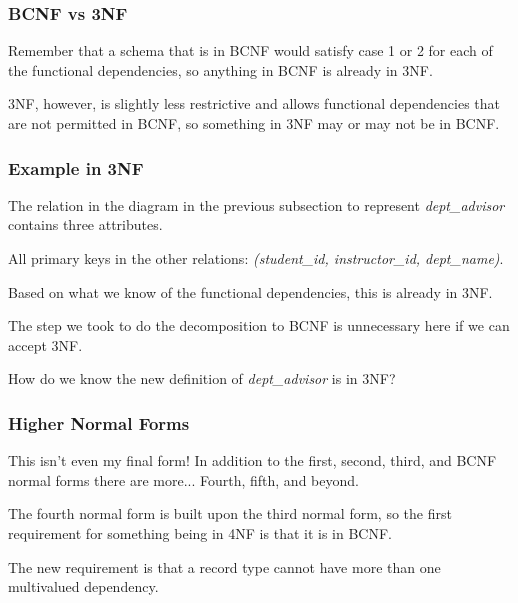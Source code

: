 \begin{frame}
\frametitle{BCNF vs 3NF}

Remember that a schema that is in BCNF would satisfy case 1 or 2 for each of the functional dependencies, so anything in BCNF is already in 3NF. 

3NF, however, is slightly less restrictive and allows functional dependencies that are not permitted in BCNF, so something in 3NF may or may not be in BCNF.

\end{frame}



\begin{frame}
\frametitle{Example in 3NF}

The relation in the diagram in the previous subsection to represent \textit{dept\_advisor} contains three attributes. 

All primary keys in the other relations: \textit{(student\_id, instructor\_id, dept\_name)}. 

Based on what we know of the functional dependencies, this is already in 3NF. 

The step we took to do the decomposition to BCNF is unnecessary here if we can accept 3NF.

How do we know the new definition of \textit{dept\_advisor} is in 3NF?

\end{frame}



\begin{frame}
\frametitle{Higher Normal Forms}

This isn't even my final form! In addition to the first, second, third, and BCNF normal forms there are more... Fourth, fifth, and beyond.  

The fourth normal form is built upon the third normal form, so the first requirement for something being in 4NF is that it is in BCNF. 

The new requirement is that a record type cannot have more than one multivalued dependency.

\end{frame}



